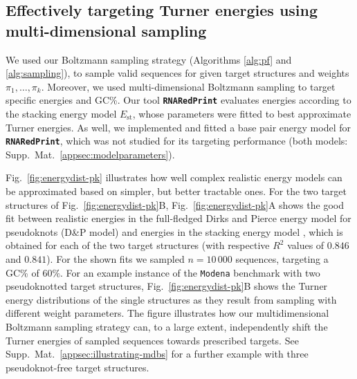 \documentclass[]{bmcart}
\newcommand{\Nuc}[1]{{\sf #1}}
\newcommand{\Cb}{\Nuc{C}}
\newcommand{\Gb}{\Nuc{G}}
\newcommand{\GCb}{\Gb\Cb}
\newcommand{\ourprog}{{\tt \bfseries{}\color{black!85}RNA\textcolor{red!70!black}{Red}Print}}
\newcommand{\EnergyStacking}{E_{\text{st}}}
\newcommand{\revised}[1]{{\color{red} #1}}
\begin{document}
\subsection*{Effectively targeting Turner energies using multi-dimensional sampling}
\revised{
We used our Boltzmann sampling strategy (Algorithms
\ref{alg:pf} and \ref{alg:sampling}), to sample valid sequences for
given target structures and weights $\pi_1,\dots,\pi_k$.  Moreover, we
used multi-dimensional Boltzmann sampling to target specific energies and
\GCb\%.  Our tool \ourprog{} evaluates energies according to the
stacking energy model $\EnergyStacking$, whose parameters were fitted
to best approximate Turner energies. As well, we implemented and
fitted a base pair energy model for \ourprog{}, which was not studied
for its targeting performance (both models:
Supp.\ Mat.~\ref{appsec:modelparameters}).
%
%


Fig.~\ref{fig:energydist-pk} illustrates how well complex realistic energy models can be approximated based on simpler, but better tractable ones. For
the two target structures of Fig.~\ref{fig:energydist-pk}B,
Fig.~\ref{fig:energydist-pk}A shows the good fit between realistic
energies in the full-fledged Dirks and Pierce energy model for
pseudoknots (D\&P model) and energies in the stacking energy
model\revised{, which is obtained for each of the two target structures (with respective $R^2$ values of $0.846$ and $0.841$)}. For the shown fits we sampled $n=10\,000$ sequences, targeting a
\GCb\% of $60\%$.
%
For an example instance of the \texttt{Modena} benchmark with two
pseudoknotted target structures, Fig.~\ref{fig:energydist-pk}B shows
the Turner energy distributions of the single structures as they
result from sampling with different weight parameters. The figure
illustrates how our multidimensional Boltzmann sampling strategy can,
to a large extent, independently shift the Turner energies of sampled
sequences towards prescribed targets. See Supp.\ Mat.~\ref{appsec:illustrating-mdbs} for a further example with three
pseudoknot-free target structures.}
\end{document}
